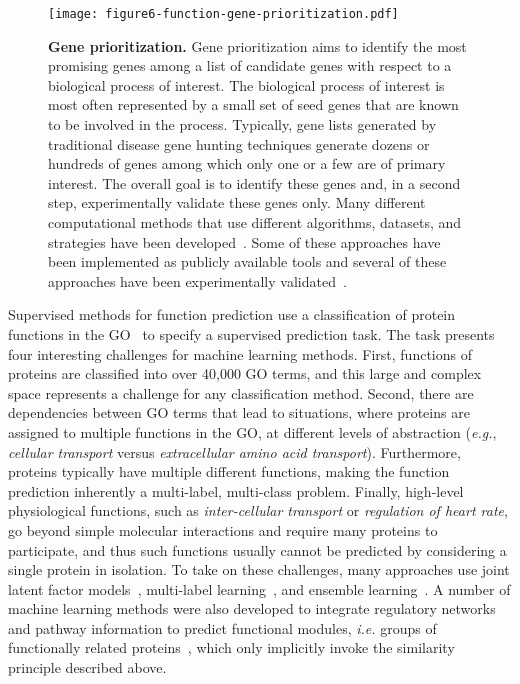 \documentclass[5p]{elsarticle}
\newcommand{\eg}{\emph{e.g.}\xspace}
\newcommand{\ie}{\emph{i.e.}\xspace}
\newcommand{\rev}[1]{{\color{black}#1}}
\begin{document}
\begin{figure}[t]
\centering
\texttt{[image: figure6-function-gene-prioritization.pdf]}
\caption{\textbf{Gene prioritization.} Gene prioritization aims to identify the most promising genes among a list of candidate genes with respect to a biological process of interest. The biological process of interest is most often represented by a small set of seed genes that are known to be involved in the process. Typically, gene lists generated by traditional disease gene hunting techniques generate dozens or hundreds of genes among which only one or a few are of primary interest. The overall goal is to identify these genes and, in a second step, experimentally validate these genes only. Many different computational methods that use different algorithms, datasets, and strategies have been developed~\rev{\cite{Zitnik2015collage,Sifrim2013extasy,Aerts2006gene,De2007kernel,Chen2009toppgene,Robinson2014improved,Simoes2015neri,Himmelstein2015heterogeneous,Kumar2018pbrit}}. Some of these approaches have been implemented as publicly available tools and several of these approaches have been experimentally validated~\rev{\cite{Zitnik2015collage,Aerts2006gene,Chen2009toppgene,Robinson2014improved,Tranchevent2016candidate}.}}
\label{fig:gene-prioritization}
\end{figure}

Supervised methods for function prediction use a classification of protein functions in \rev{the GO~\cite{Ashburner2000gene}} to specify a supervised prediction task.
\rev{The task presents} four interesting challenges for machine learning methods.
First, functions of proteins are classified into over 40,000 \rev{GO terms,} and this large and complex space represents a challenge for any classification method.
Second, there are dependencies between \rev{GO terms that} lead to situations, where proteins are assigned to multiple functions in the GO, at different levels of abstraction (\eg, {\em cellular transport} versus {\em extracellular amino acid transport}).
Furthermore, proteins typically have multiple different functions, making the function prediction inherently a multi-label, multi-class problem.
Finally, high-level physiological functions, such as {\em inter-cellular transport} or {\em regulation of heart rate}, go beyond simple molecular interactions and require many proteins to participate, and thus such functions usually cannot be predicted by considering a single protein in isolation.
To take on these challenges, many approaches use joint latent factor models~\cite{Zitnik2014matrix,Gligorijevic2014integration}, multi-label learning~\cite{Mostafavi2008genemania}, and ensemble learning~\cite{Wu2010prediction,Pandey2010integrative,Hooghe2012flexible,Bonnet2015integrative}.
A number of machine learning methods \rev{were} also developed to integrate regulatory networks and pathway information to predict functional modules, \ie groups of functionally related proteins~\cite{Heiser2009integrated,Nibbe2010integrative,Zitnik2015netinf,Bonnet2015integrative,Rudolph2016elucidation,Piccolo2016integrative}, which only implicitly invoke the similarity principle described above.
\end{document}
